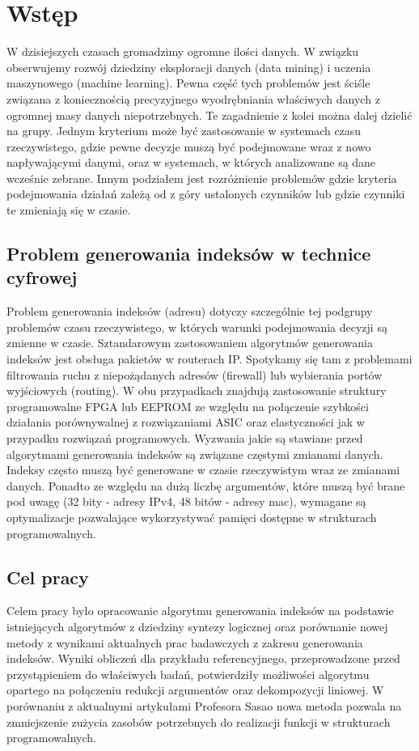 \chapter{Wstęp}

W dzisiejszych czasach gromadzimy ogromne ilości danych. W związku obserwujemy rozwój dziedziny eksploracji danych (data mining) i uczenia maszynowego (machine learning). Pewna część tych problemów jest ściśle związana z koniecznością precyzyjnego wyodrębniania właściwych danych z ogromnej masy danych niepotrzebnych. Te zagadnienie z kolei można dalej dzielić na grupy. Jednym kryterium może być zastosowanie w systemach czasu rzeczywistego, gdzie pewne decyzje muszą być podejmowane wraz z nowo napływającymi danymi, oraz w systemach, w których analizowane są dane wcześnie zebrane. Innym podziałem jest rozróżnienie problemów gdzie kryteria podejmowania działań zależą od z góry ustalonych czynników lub gdzie czynniki te zmieniają się w czasie.

\section{Problem generowania indeksów w technice cyfrowej}

Problem generowania indeksów (adresu) dotyczy szczególnie tej podgrupy problemów czasu rzeczywistego, w których warunki podejmowania decyzji są zmienne w czasie. Sztandarowym zastosowaniem algorytmów generowania indeksów jest obsługa pakietów w routerach IP. Spotykamy się tam z problemami filtrowania ruchu z niepożądanych adresów (firewall) lub wybierania portów wyjściowych (routing). W obu przypadkach znajdują zastosowanie struktury programowalne FPGA lub EEPROM ze względu na połączenie szybkości działania porównywalnej z rozwiązaniami ASIC oraz elastyczności jak w przypadku rozwiązań programowych.
Wyzwania jakie są stawiane przed algorytmami generowania indeksów są związane częstymi zmianami danych. Indeksy często muszą być generowane w czasie rzeczywistym wraz ze zmianami danych. Ponadto ze względu na dużą liczbę argumentów, które muszą być brane pod uwagę (32 bity - adresy IPv4, 48 bitów - adresy mac), wymagane są optymalizacje pozwalające wykorzystywać pamięci dostępne w strukturach programowalnych.

\section{Cel pracy}

Celem pracy było opracowanie algorytmu generowania indeksów na podstawie istniejących algorytmów z dziedziny syntezy logicznej oraz porównanie nowej metody z wynikami aktualnych prac badawczych z zakresu generowania indeksów. Wyniki obliczeń dla przykładu referencyjnego, przeprowadzone przed przystąpieniem do właściwych badań, potwierdziły możliwości algorytmu opartego na połączeniu redukcji argumentów oraz dekompozycji liniowej. W porównaniu z aktualnymi artykułami Profesora Sasao nowa metoda pozwala na zmniejszenie zużycia zasobów potrzebnych do realizacji funkcji w strukturach programowalnych.
